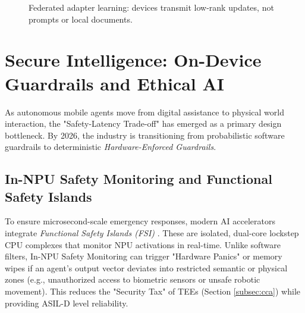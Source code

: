 \documentclass[twocolumn,10pt]{article}
\begin{document}
\begin{figure}[t]
\centering
{}
\caption{Federated adapter learning: devices transmit low-rank updates, not prompts or local documents.}
\label{fig:federated}
\end{figure}

\section{Secure Intelligence: On-Device Guardrails and Ethical AI}
As autonomous mobile agents move from digital assistance to physical world interaction, the "Safety-Latency Trade-off" has emerged as a primary design bottleneck. By 2026, the industry is transitioning from probabilistic software guardrails to deterministic \textit{Hardware-Enforced Guardrails}.

\subsection{In-NPU Safety Monitoring and Functional Safety Islands}
To ensure microsecond-scale emergency responses, modern AI accelerators integrate \textit{Functional Safety Islands (FSI)} \cite{nvidia_fsi_2023}. These are isolated, dual-core lockstep CPU complexes that monitor NPU activations in real-time. Unlike software filters, In-NPU Safety Monitoring can trigger "Hardware Panics" or memory wipes if an agent's output vector deviates into restricted semantic or physical zones (e.g., unauthorized access to biometric sensors or unsafe robotic movement). This reduces the "Security Tax" of TEEs (Section \ref{subsec:cca}) while providing ASIL-D level reliability.
\end{document}

